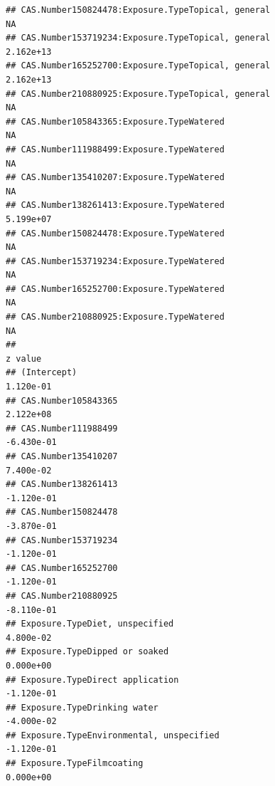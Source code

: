 \documentclass[
  12pt,
]{article}
\begin{document}
\begin{verbatim}
## CAS.Number150824478:Exposure.TypeTopical, general                                       NA
## CAS.Number153719234:Exposure.TypeTopical, general                                2.162e+13
## CAS.Number165252700:Exposure.TypeTopical, general                                2.162e+13
## CAS.Number210880925:Exposure.TypeTopical, general                                       NA
## CAS.Number105843365:Exposure.TypeWatered                                                NA
## CAS.Number111988499:Exposure.TypeWatered                                                NA
## CAS.Number135410207:Exposure.TypeWatered                                                NA
## CAS.Number138261413:Exposure.TypeWatered                                         5.199e+07
## CAS.Number150824478:Exposure.TypeWatered                                                NA
## CAS.Number153719234:Exposure.TypeWatered                                                NA
## CAS.Number165252700:Exposure.TypeWatered                                                NA
## CAS.Number210880925:Exposure.TypeWatered                                                NA
##                                                                                    z value
## (Intercept)                                                                      1.120e-01
## CAS.Number105843365                                                              2.122e+08
## CAS.Number111988499                                                             -6.430e-01
## CAS.Number135410207                                                              7.400e-02
## CAS.Number138261413                                                             -1.120e-01
## CAS.Number150824478                                                             -3.870e-01
## CAS.Number153719234                                                             -1.120e-01
## CAS.Number165252700                                                             -1.120e-01
## CAS.Number210880925                                                             -8.110e-01
## Exposure.TypeDiet, unspecified                                                   4.800e-02
## Exposure.TypeDipped or soaked                                                    0.000e+00
## Exposure.TypeDirect application                                                 -1.120e-01
## Exposure.TypeDrinking water                                                     -4.000e-02
## Exposure.TypeEnvironmental, unspecified                                         -1.120e-01
## Exposure.TypeFilmcoating                                                         0.000e+00

\end{verbatim}
\end{document}
